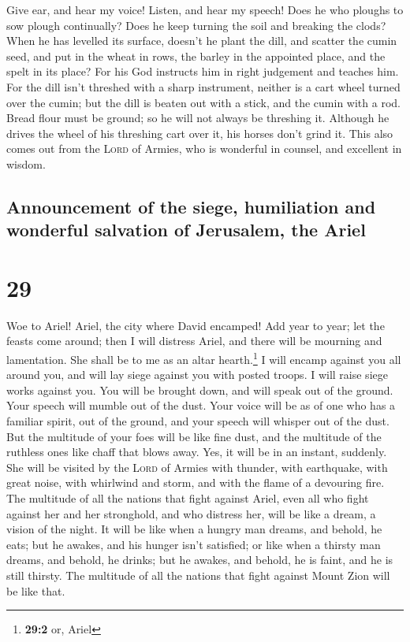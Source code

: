  Give ear, and hear my voice! Listen, and hear my speech!
 Does he who ploughs to sow plough continually? Does he
keep turning the soil and breaking the clods?  When he
has levelled its surface, doesn't he plant the dill, and scatter the
cumin seed, and put in the wheat in rows, the barley in the appointed
place, and the spelt in its place?  For his God instructs
him in right judgement and teaches him.  For the dill
isn't threshed with a sharp instrument, neither is a cart wheel turned
over the cumin; but the dill is beaten out with a stick, and the cumin
with a rod.  Bread flour must be ground; so he will not
always be threshing it. Although he drives the wheel of his threshing
cart over it, his horses don't grind it.  This also comes
out from the \textsc{Lord} of Armies, who is wonderful in counsel, and
excellent in wisdom.

\hypertarget{announcement-of-the-siege-humiliation-and-wonderful-salvation-of-jerusalem-the-ariel}{%
\subsection{Announcement of the siege, humiliation and wonderful
salvation of Jerusalem, the
Ariel}\label{announcement-of-the-siege-humiliation-and-wonderful-salvation-of-jerusalem-the-ariel}}

\hypertarget{section-28}{%
\section{29}\label{section-28}}

 Woe to Ariel! Ariel, the city where David encamped! Add
year to year; let the feasts come around;  then I will
distress Ariel, and there will be mourning and lamentation. She shall be
to me as an altar hearth.\footnote{\textbf{29:2} or, Ariel}
 I will encamp against you all around you, and will lay
siege against you with posted troops. I will raise siege works against
you.  You will be brought down, and will speak out of the
ground. Your speech will mumble out of the dust. Your voice will be as
of one who has a familiar spirit, out of the ground, and your speech
will whisper out of the dust.  But the multitude of your
foes will be like fine dust, and the multitude of the ruthless ones like
chaff that blows away. Yes, it will be in an instant, suddenly.
 She will be visited by the \textsc{Lord} of Armies with
thunder, with earthquake, with great noise, with whirlwind and storm,
and with the flame of a devouring fire.  The multitude of
all the nations that fight against Ariel, even all who fight against her
and her stronghold, and who distress her, will be like a dream, a vision
of the night.  It will be like when a hungry man dreams,
and behold, he eats; but he awakes, and his hunger isn't satisfied; or
like when a thirsty man dreams, and behold, he drinks; but he awakes,
and behold, he is faint, and he is still thirsty. The multitude of all
the nations that fight against Mount Zion will be like that.

